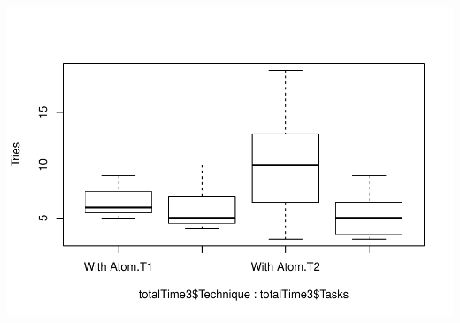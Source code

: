\documentclass[]{article}
\begin{document}
\includegraphics{main_files/figure-latex/unnamed-chunk-7-1.pdf}
\end{document}
